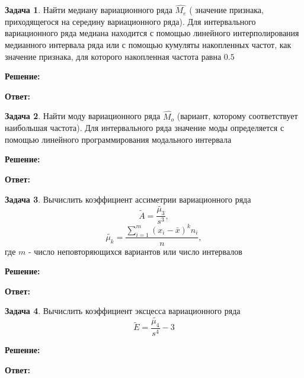 \documentclass[a4paper,12pt]{article}
\theoremstyle{definition}
\newtheorem{problem}{Задача}
\newenvironment{solution}
{\begin{shaded}\textbf{Решение:}\par}
{\end{shaded}}
\newenvironment{answer}
{\par\noindent\textbf{Ответ:} \color{blue}}
{\par}
\begin{document}
\vspace{8pt}
\begin{problem}
    Найти медиану вариационного ряда \(\hat{M_e}\) ( значение признака, приходящегося на
    середину вариационного ряда). Для интервального вариационного ряда медиана
    находится с помощью линейного интерполирования медианного интервала ряда
    или с помощью кумуляты накопленных частот, как значение признака, для
    которого накопленная частота равна \(0.5\)
    
        \begin{solution}
        \end{solution}
    
        \begin{answer}
        \end{answer}
    
    \end{problem}



\vspace{8pt}
\begin{problem}
    Найти моду вариационного ряда \(\hat{M_o}\) (вариант, которому соответствует
    наибольшая частота). Для интервального ряда значение моды определяется с
    помощью линейного программирования модального интервала
    
        \begin{solution}
        \end{solution}
    
        \begin{answer}
        \end{answer}
    
    \end{problem}




\vspace{8pt}
\begin{problem}
    Вычислить коэффициент ассиметрии вариационного ряда
    \[\tilde{A} = \frac{\tilde{\mu_3}}{s^3},\]
    \[\tilde{\mu_k} = \frac{\sum^m_{i=1}(x_i - \bar{x})^k n_i}{n},\]
    где \(m\) - число неповторяющихся вариантов или число интервалов     
        \begin{solution}
        \end{solution}
    
        \begin{answer}
        \end{answer}
    
    \end{problem}

\vspace{8pt}
\begin{problem}
    Вычислить коэффициент эксцесса вариационного ряда
    \[\tilde{E} = \frac{\tilde{\mu_4}}{s^4} - 3\]
    
        \begin{solution}
        \end{solution}
    
        \begin{answer}
        \end{answer}
    
    \end{problem}
\end{document}

